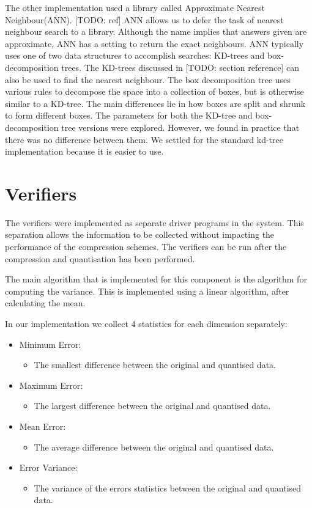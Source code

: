 \documentclass[a4paper,11pt]{report}
\begin{document}
The other implementation used a library called Approximate Nearest Neighbour(ANN). [TODO: ref] ANN allows us to defer the task of nearest neighbour search to a library. Although the name implies that answers given are approximate, ANN has a setting to return the exact neighbours. ANN typically uses one of two data structures to accomplish searches: KD-trees and box-decomposition trees. The KD-trees discussed in [TODO: section reference] can also be used to find the nearest neighbour. The box decomposition tree uses various rules to decompose the space into a collection of boxes, but is otherwise similar to a KD-tree. The main differences lie in how boxes are split and shrunk to form different boxes. The parameters for both the KD-tree and box-decomposition tree versions were explored. However, we found in practice that there was no difference between them. We settled for the standard kd-tree implementation because it is easier to use.

\section{Verifiers}

The verifiers were implemented as separate driver programs in the system. This separation allows the information to be collected without impacting the performance of the compression schemes. The verifiers can be run after the compression and quantisation has been performed.

The main algorithm that is implemented for this component is the algorithm for computing the variance. This is implemented using a linear algorithm, after calculating the mean.

In our implementation we collect 4 statistics for each dimension separately:
\begin{itemize}
 \item Minimum Error: 
 \begin{itemize}
   \item The smallest difference between the original and quantised data.
 \end{itemize}
 \item Maximum Error:
 \begin{itemize}
   \item The largest difference between the original and quantised data.
 \end{itemize}
 \item Mean Error:
 \begin{itemize}
   \item The average difference between the original and quantised data.
 \end{itemize}
 \item Error Variance:
 \begin{itemize}
   \item The variance of the errors statistics between the original and quantised data.  
 \end{itemize}
\end{itemize}
\end{document}
